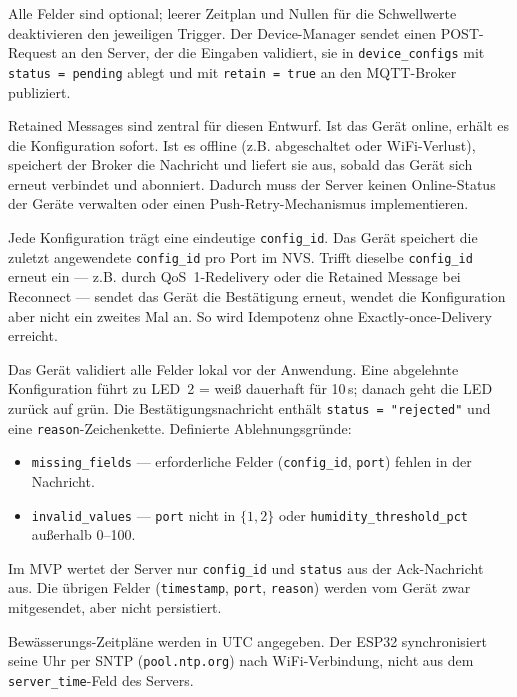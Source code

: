\documentclass[a4paper,12pt]{article}
\begin{document}
\noindent Alle Felder sind optional; leerer Zeitplan und Nullen für
die Schwellwerte deaktivieren den jeweiligen Trigger. Der Device-Manager
sendet einen POST-Request an den Server, der die Eingaben validiert,
sie in \texttt{device\_configs} mit \texttt{status = pending} ablegt
und mit \texttt{retain = true} an den MQTT-Broker publiziert.

Retained Messages sind zentral für diesen Entwurf. Ist das Gerät
online, erhält es die Konfiguration sofort. Ist es offline (z.B.
abgeschaltet oder WiFi-Verlust), speichert der Broker die Nachricht
und liefert sie aus, sobald das Gerät sich erneut verbindet und
abonniert. Dadurch muss der Server keinen Online-Status der Geräte
verwalten oder einen Push-Retry-Mechanismus implementieren.

Jede Konfiguration trägt eine eindeutige \texttt{config\_id}. Das
Gerät speichert die zuletzt angewendete \texttt{config\_id} pro Port
im NVS. Trifft dieselbe \texttt{config\_id} erneut ein --- z.B.
durch QoS~1-Redelivery oder die Retained Message bei Reconnect ---
sendet das Gerät die Bestätigung erneut, wendet die Konfiguration
aber nicht ein zweites Mal an. So wird Idempotenz ohne
Exactly-once-Delivery erreicht.

Das Gerät validiert alle Felder lokal vor der Anwendung. Eine
abgelehnte Konfiguration führt zu LED~2 = weiß dauerhaft für
10\,s; danach geht die LED zurück auf grün. Die Bestätigungsnachricht
enthält \texttt{status = "rejected"} und eine \texttt{reason}-Zeichenkette.
Definierte Ablehnungsgründe:

\begin{itemize}
  \item \texttt{\textquotedbl missing\_fields\textquotedbl} ---
        erforderliche Felder (\texttt{config\_id}, \texttt{port})
        fehlen in der Nachricht.
  \item \texttt{\textquotedbl invalid\_values\textquotedbl} ---
        \texttt{port} nicht in $\{1, 2\}$ oder
        \texttt{humidity\_threshold\_pct} außerhalb 0--100.
\end{itemize}

\noindent Im MVP wertet der Server nur \texttt{config\_id} und
\texttt{status} aus der Ack-Nachricht aus. Die übrigen Felder
(\texttt{timestamp}, \texttt{port}, \texttt{reason}) werden vom
Gerät zwar mitgesendet, aber nicht persistiert.

Bewässerungs-Zeitpläne werden in UTC angegeben. Der ESP32
synchronisiert seine Uhr per SNTP (\texttt{pool.ntp.org}) nach
WiFi-Verbindung, nicht aus dem \texttt{server\_time}-Feld des Servers.
\end{document}
